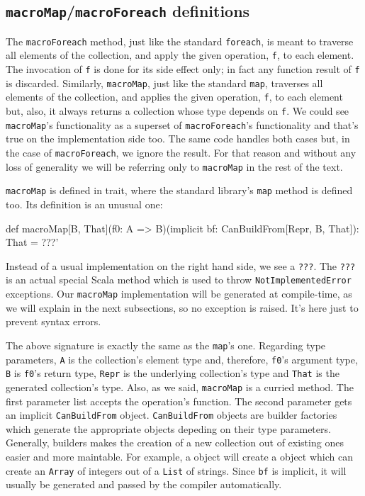 \subsection{ \texttt{macroMap}/\texttt{macroForeach} definitions}

The \texttt{macroForeach} method, just like the standard \texttt{foreach}, is meant to traverse
all elements of the collection, and apply the given operation, \texttt{f}, to each
element. The invocation of \texttt{f} is done for its side effect only; in fact any
function result of \texttt{f} is discarded. Similarly, \texttt{macroMap}, just like the standard
\texttt{map}, traverses all elements of the collection, and applies the given operation,
\texttt{f}, to each element but, also, it always returns a collection whose type depends
on \texttt{f}. We could see \texttt{macroMap}'s functionality as a superset of \texttt{macroForeach}'s
functionality and that's true on the implementation side too. The same code
handles both cases but, in the case of \texttt{macroForeach}, we ignore the result. For
that reason and without any loss of generality we will be referring only to
\texttt{macroMap} in the rest of the text.

\texttt{macroMap} is defined in  trait, where the
standard library's \texttt{map} method is defined too. Its definition is an unusual one:

\begin{scalaCode}
def macroMap[B, That](f0: A => B)(implicit bf: CanBuildFrom[Repr, B, That]): That = ???'
\end{scalaCode}

Instead of a usual implementation on the right hand side, we see a \texttt{???}. The \texttt{???}
is an actual special Scala method which is used to throw \texttt{NotImplementedError}
exceptions. Our \texttt{macroMap} implementation will be generated at compile-time, as
we will explain in the next subsections, so no exception is raised. It's here
just to prevent syntax errors. 

The above signature is exactly the same as the \texttt{map}'s one. Regarding
type parameters, \texttt{A} is the collection's element type and, therefore, \texttt{f0}'s
argument type, \texttt{B} is \texttt{f0}'s return type, \texttt{Repr} is the underlying collection's type
and \texttt{That} is the generated collection's type. Also, as we said, \texttt{macroMap} is a
curried method. The first parameter list accepts the operation's function. The
second parameter gets an implicit \texttt{CanBuildFrom} object. \texttt{CanBuildFrom} objects are
builder factories which generate the appropriate
 objects depeding on their type parameters.
Generally, builders makes the creation of a new collection out of existing ones
easier and more maintable. For example, a  object will create a  object which can
create an \texttt{Array} of integers out of a \texttt{List} of strings. Since \texttt{bf} is implicit, it
will usually be generated and passed by the compiler automatically.


